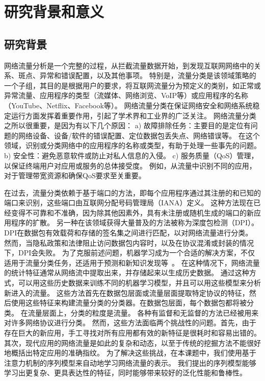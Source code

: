 \documentclass[degree=master,cjk-font=noto]{thuthesis}
\begin{document}
\maketitle

\frontmatter

\tableofcontents


\mainmatter

\chapter{研究背景和意义}

\section{研究背景}

网络流量分析是一个完整的过程，从拦截流量数据开始，到发现互联网网络中的关系、斑点、异常和错误配置，以及其他事项。
特别是，流量分类是该领域策略的一个子组，其目的是根据用户的要求，将互联网流量分为预定义的类别，如正常或异常流量、应用程序的类型（流媒体、网络浏览、VoIP等）或应用程序的名称（YouTube、Netflix、Facebook等）。
网络流量分类在保证网络安全和网络系统稳定运行方面发挥着重要作用，引起了学术界和工业界的广泛关注。
网络流量分类之所以很重要，是因为有以下几个原因：
a) 故障排除任务：主要目的是定位有问题的网络设备、设备/软件的错误配置、定位数据包丢失点、网络错误等。
在这个领域，识别或分类网络中的应用程序的名称或类型，有助于处理一些事先的问题。
b) 安全性：避免恶意软件或防止对私人信息的入侵。
c) 服务质量（QoS）管理，以保证终端用户对应用或服务的总体接受度。
例如，从流量中识别不同的应用，对于管理带宽资源和确保QoS要求至关重要。

在过去，流量分类依赖于基于端口的方法，即每个应用程序通过其注册的和已知的端口来识别，这些端口由互联网分配号码管理局（IANA）定义。
这种方法现在已经变得不可靠和不准确，因为除其他因素外，具有未注册或随机生成的端口的新应用程序的扩散。
另一种在该领域获得大量普及的方法被称为深度包检测（DPI）。
DPI在数据包有效载荷和存储的签名集之间进行匹配，以对网络流量进行分类。
然而，当隐私政策和法律阻止访问数据包内容时，以及在协议混淆或封装的情况下，DPI会失败。
为了克服前述问题，机器学习成为一个合适的解决方案，不仅适用于流量分类任务，还适用于预测和新知识发现等~\cite{net2,net3,app_class,SDN_HGW,DMTCS,bitcoding}。
在这种情况下，网络流量的统计特征通常从网络流中提取出来，并存储起来以生成历史数据。
通过这种方式，可以用这些历史数据来训练不同的机器学习模型，并且可以用这些模型来分析新进入的流量。
这些方法首先在数据包层面或流量层面提取特定协议的特征，然后使用这些特征来构建流量分类的分类器。在数据包层面，每个数据包都将被分类。
在流量层面上，分类的粒度是流量。
各种有监督和无监督的方法已经被用来对许多网络协议进行分类。
然而，这些方法面临两个挑战性的问题。首先，由于存在巨大的新应用，手工寻找对所有应用都有效的新特征是很耗时和容易出错的。
其次，现代应用的网络流量是如此的复杂和动态，以至于传统的挖掘方法不能很好地概括出特定应用的准确指纹。
为了解决这些挑战，在本课题中，我们使用基于注意力机制的序列模型来自动地学习网络流量的表示。
我们提出的序列模型能够学习出更复杂、更具表达性的特征，同时能够带来较好的泛化性能和鲁棒性。
\end{document}
